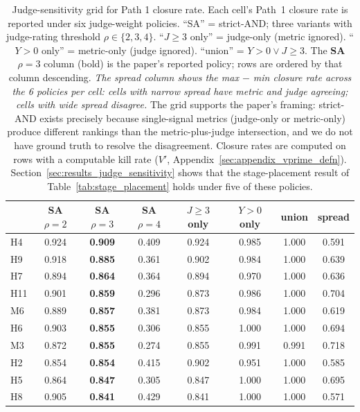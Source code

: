 \begin{table}[!htbp]
\centering
\footnotesize
\caption{Judge-sensitivity grid for Path 1 closure rate. Each cell's Path~1 closure rate is reported under six judge-weight policies. ``SA'' = strict-AND; three variants with judge-rating threshold $\rho \in \{2, 3, 4\}$. ``$J{\geq}3$ only'' = judge-only (metric ignored). ``$Y{>}0$ only'' = metric-only (judge ignored). ``union'' = $Y > 0 \vee J \geq 3$. The \textbf{SA $\rho{=}3$} column (bold) is the paper's reported policy; rows are ordered by that column descending. \emph{The spread column shows the max $-$ min closure rate across the 6 policies per cell: cells with narrow spread have metric and judge agreeing; cells with wide spread disagree.} The grid supports the paper's framing: strict-AND exists precisely because single-signal metrics (judge-only or metric-only) produce different rankings than the metric-plus-judge intersection, and we do not have ground truth to resolve the disagreement. Closure rates are computed on rows with a computable kill rate ($V'$, Appendix~\ref{sec:appendix_vprime_defn}). Section~\ref{sec:results_judge_sensitivity} shows that the stage-placement result of Table~\ref{tab:stage_placement} holds under five of these policies.}
\label{tab:judge_sensitivity_grid}
\begin{tabular*}{\textwidth}{@{\extracolsep{\fill}}lccccccc@{}}
\toprule
 & SA $\rho{=}2$ & \textbf{SA $\rho{=}3$} & SA $\rho{=}4$ & $J{\geq}3$ only & $Y{>}0$ only & union & spread \\
\midrule
H4 & 0.924 & \textbf{0.909} & 0.409 & 0.924 & 0.985 & 1.000 & 0.591 \\
H9 & 0.918 & \textbf{0.885} & 0.361 & 0.902 & 0.984 & 1.000 & 0.639 \\
H7 & 0.894 & \textbf{0.864} & 0.364 & 0.894 & 0.970 & 1.000 & 0.636 \\
H11 & 0.901 & \textbf{0.859} & 0.296 & 0.873 & 0.986 & 1.000 & 0.704 \\
M6 & 0.889 & \textbf{0.857} & 0.381 & 0.873 & 0.984 & 1.000 & 0.619 \\
H6 & 0.903 & \textbf{0.855} & 0.306 & 0.855 & 1.000 & 1.000 & 0.694 \\
M3 & 0.872 & \textbf{0.855} & 0.274 & 0.855 & 0.991 & 0.991 & 0.718 \\
H2 & 0.854 & \textbf{0.854} & 0.415 & 0.902 & 0.951 & 1.000 & 0.585 \\
H5 & 0.864 & \textbf{0.847} & 0.305 & 0.847 & 1.000 & 1.000 & 0.695 \\
H8 & 0.905 & \textbf{0.841} & 0.429 & 0.841 & 1.000 & 1.000 & 0.571 \\

\end{tabular*}
\end{table}
